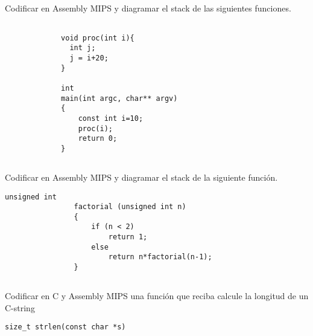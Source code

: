 \subsection{}
     Codificar en Assembly MIPS y diagramar el stack de las siguientes funciones.
           \begin{small}
             \begin{lstlisting}[style=6620C]
             
             void proc(int i){
               int j;
               j = i+20; 
             } 

             int 
             main(int argc, char** argv)
             {
                 const int i=10; 
                 proc(i); 
                 return 0; 
             } 
           \end{lstlisting}
     \end{small}

\subsection{}
  Codificar en Assembly MIPS y diagramar el stack de la siguiente función.
		\begin{small}
			\begin{lstlisting}[style=6620C]
				unsigned int
				factorial (unsigned int n)
				{
				    if (n < 2)
				        return 1;
				    else 
				        return n*factorial(n-1);
				}
			\end{lstlisting}
		\end{small}

\subsection{}
  Codificar en C  y Assembly MIPS una función que reciba calcule la longitud de un C-string\\
  \begin{lstlisting}[style=6620C]
  size_t strlen(const char *s)
  \end{lstlisting}
